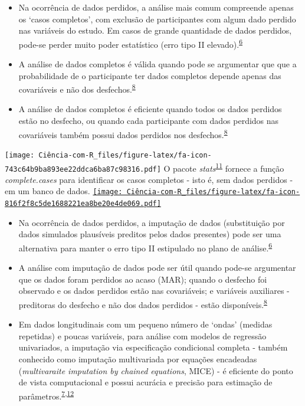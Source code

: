 \documentclass[
]{book}
\begin{document}
\begin{itemize}
\item
  Na ocorrência de dados perdidos, a análise mais comum compreende apenas os `casos completos', com exclusão de participantes com algum dado perdido nas variáveis do estudo. Em casos de grande quantidade de dados perdidos, pode-se perder muito poder estatístico (erro tipo II elevado).\textsuperscript{\protect\hyperlink{ref-Altman2007}{6}}
\item
  A análise de dados completos é válida quando pode se argumentar que que a probabilidade de o participante ter dados completos depende apenas das covariáveis e não dos desfechos.\textsuperscript{\protect\hyperlink{ref-carpenter2021}{8}}
\item
  A análise de dados completos é eficiente quando todos os dados perdidos estão no desfecho, ou quando cada participante com dados perdidos nas covariáveis também possui dados perdidos nos desfechos.\textsuperscript{\protect\hyperlink{ref-carpenter2021}{8}}
\end{itemize}

\texttt{[image: Ciência-com-R\_files/figure-latex/fa-icon-743c64b9ba893ee22ddca6ba87c98316.pdf]} O pacote \emph{stats}\textsuperscript{\protect\hyperlink{ref-stats}{11}} fornece a função \emph{complete.cases} para identificar os casos completos - isto é, sem dados perdidos - em um banco de dados. \href{https://stat.ethz.ch/R-manual/R-devel/library/stats/html/stats-package.html}{\texttt{[image: Ciência-com-R\_files/figure-latex/fa-icon-816f2f8c5de1688221ea8be20e4de069.pdf]}}

\begin{itemize}
\item
  Na ocorrência de dados perdidos, a imputação de dados (substituição por dados simulados plausíveis preditos pelos dados presentes) pode ser uma alternativa para manter o erro tipo II estipulado no plano de análise.\textsuperscript{\protect\hyperlink{ref-Altman2007}{6}}
\item
  A análise com imputação de dados pode ser útil quando pode-se argumentar que os dados foram perdidos ao acaso (MAR); quando o desfecho foi observado e os dados perdidos estão nas covariáveis; e variáveis auxiliares - preditoras do desfecho e não dos dados perdidos - estão disponíveis.\textsuperscript{\protect\hyperlink{ref-carpenter2021}{8}}
\item
  Em dados longitudinais com um pequeno número de `ondas' (medidas repetidas) e poucas variáveis, para análise com modelos de regressão univariados, a imputação via especificação condicional completa - também conhecido como imputação multivariada por equações encadeadas (\emph{multivaraite imputation by chained equations}, MICE) - é eficiente do ponto de vista computacional e possui acurácia e precisão para estimação de parâmetros.\textsuperscript{\protect\hyperlink{ref-Heymans2022}{7},\protect\hyperlink{ref-Cao2022}{12}}
\end{itemize}
\end{document}
